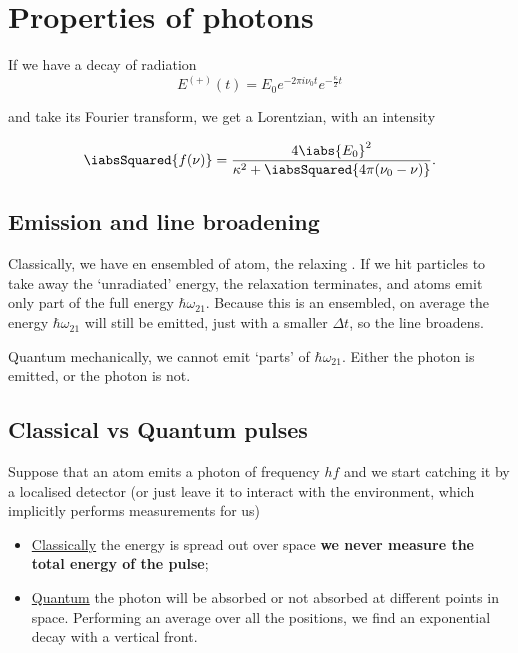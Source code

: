 \section{Properties of photons}
 If we have a decay of radiation
 \begin{equation}\label{key}
 	E^{(+)}(t) = E_0e^{-2\pi i \nu_0t}e^{-\frac{\kappa}{2}t}
 \end{equation}
 
 \noindent and take its Fourier transform, we get a Lorentzian, with an intensity
 
 \begin{equation}\label{key}
 	\iabsSquared{f(\nu)} = \frac{4\iabs{E_0}^2}{\kappa^2 + \iabsSquared{4\pi(\nu_0 - \nu)}}.
 \end{equation}
 

 \subsection{Emission and line broadening}
  Classically, we have en ensembled of atom, the relaxing \ra{}. If we hit particles to take away the `unradiated' energy, the relaxation terminates, and atoms emit only part of the full energy $ \hbar\omega_{21} $. Because this is an ensembled, on average the energy $ \hbar\omega_{21} $ will still be emitted, just with a smaller $ \Delta t $, so the line broadens.
  
  Quantum mechanically, we cannot emit `parts' of $ \hbar\omega_{21} $. Either the photon is emitted, or the photon is not. 
 
 \subsection{Classical vs Quantum pulses}
  Suppose that an atom emits a photon of frequency $ hf $ and we start catching it by a localised detector (or just leave it to interact with the environment, which implicitly performs measurements for us)
  \begin{itemize}
  	\item \underline{Classically} the energy is spread out over space \ra \textbf{we never measure the total energy of the pulse};
  	\item \underline{Quantum} the photon will be absorbed or not absorbed at different points in space. Performing an average over all the positions, we find an exponential decay with a vertical front.
  \end{itemize}
 
